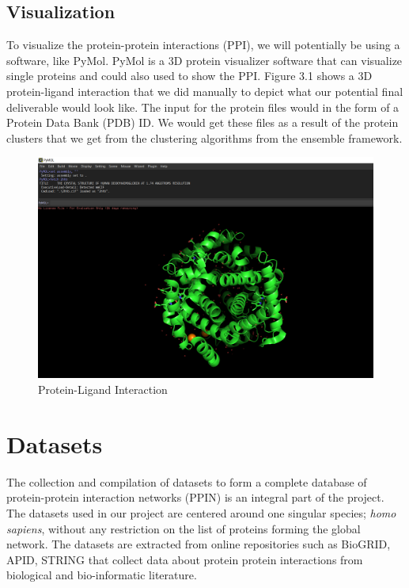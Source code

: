 \subsection{Visualization}
To visualize the protein-protein interactions (PPI), we will potentially be using a software, like PyMol. PyMol is a 3D protein visualizer software that can visualize single proteins and could also used to show the PPI. Figure 3.1 shows a 3D protein-ligand interaction that we did manually to depict what our potential final deliverable would look like. The input for the protein files would in the form of a Protein Data Bank (PDB) ID. We would get these files as a result of the protein clusters that we get from the clustering algorithms from the ensemble framework.
\begin{figure}[h!]
\centering
\includegraphics[scale=0.5]{./PyMol.png}
\caption{Protein-Ligand Interaction}
\label{fig:PyMol}
\end{figure}

\section{Datasets}
The collection and compilation of datasets to form a complete database of protein-protein interaction networks (PPIN) is an integral part of the project. The datasets used in our project are centered around one singular species; \textit{homo sapiens}, without any restriction on the list of proteins forming the global network. The datasets are extracted from online repositories such as BioGRID, APID, STRING that collect data about protein protein interactions from biological and bio-informatic literature. 

